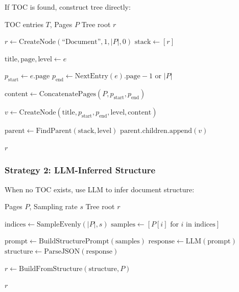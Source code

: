 \documentclass[12pt,a4paper]{article}
\begin{document}
If TOC is found, construct tree directly:

\begin{algorithm}[H]
\caption{Build Tree from TOC}
\begin{algorithmic}[1]
\Require TOC entries $T$, Pages $P$
\Ensure Tree root $r$

\State $r \gets \text{CreateNode}(\text{``Document''}, 1, |P|, 0)$
\State $\text{stack} \gets [r]$

    \State $\text{title}, \text{page}, \text{level} \gets e$
    
    \State $p_{\text{start}} \gets e.\text{page}$
    \State $p_{\text{end}} \gets \text{NextEntry}(e).\text{page} - 1$ or $|P|$
    
    \State $\text{content} \gets \text{ConcatenatePages}(P, p_{\text{start}}, p_{\text{end}})$
    
    \State $v \gets \text{CreateNode}(\text{title}, p_{\text{start}}, p_{\text{end}}, \text{level}, \text{content})$
    
    \State $\text{parent} \gets \text{FindParent}(\text{stack}, \text{level})$
    \State $\text{parent.children.append}(v)$
\EndFor

\State \Return $r$
\end{algorithmic}
\end{algorithm}

\subsubsection{Strategy 2: LLM-Inferred Structure}

When no TOC exists, use LLM to infer document structure:

\begin{algorithm}[H]
\caption{Infer Structure with LLM}
\begin{algorithmic}[1]
\Require Pages $P$, Sampling rate $s$
\Ensure Tree root $r$

\State $\text{indices} \gets \text{SampleEvenly}(|P|, s)$
\State $\text{samples} \gets [P[i] \text{ for } i \text{ in indices}]$

\State $\text{prompt} \gets \text{BuildStructurePrompt}(\text{samples})$
\State $\text{response} \gets \text{LLM}(\text{prompt})$
\State $\text{structure} \gets \text{ParseJSON}(\text{response})$

\State $r \gets \text{BuildFromStructure}(\text{structure}, P)$

\State \Return $r$
\end{algorithmic}
\end{algorithm}
\end{document}
